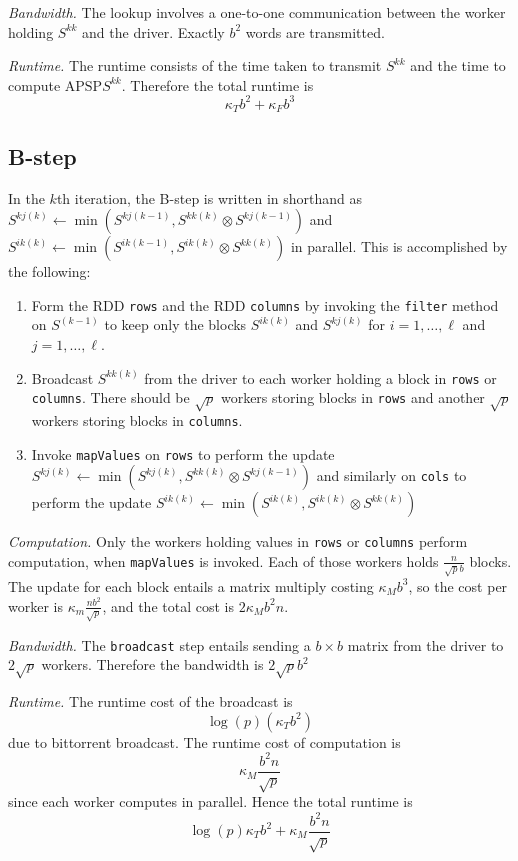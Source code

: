 \documentclass{article} %
\begin{document}
\emph{Bandwidth.}
The lookup involves a one-to-one communication between the worker holding $S^{kk}$ and the driver.
Exactly $b^2$ words are transmitted.

\emph{Runtime.}
The runtime consists of the time taken to transmit $S^{kk}$ and the time to compute $\text{APSP}S^{kk}$.
Therefore the total runtime is
\[
\kappa_T b^2 + \kappa_F b^3
\]

\subsection{B-step}
In the $k$th iteration, the B-step is written in shorthand as
 $S^{kj(k)} \leftarrow \min(S^{kj(k-1)}, S^{kk(k)} \otimes S^{kj(k-1)})$ 
and 
$S^{ik(k)} \leftarrow \min(S^{ik(k-1)}, S^{ik(k)} \otimes S^{kk(k)})$
 in parallel.
This is accomplished by the following:
\begin{enumerate}
\item Form the RDD {\tt rows} and the RDD {\tt columns} by invoking
  the {\tt filter} method on $S^{(k-1)}$ to keep only the blocks
  $S^{ik(k)}$ and $S^{kj(k)}$ for $i = 1,\hdots, \ell$ and $j =
  1,\hdots, \ell$.
\item Broadcast $S^{kk(k)}$ from the driver to each worker holding a
  block in {\tt rows} or {\tt columns}.  There should be $\sqrt{p}$
  workers storing blocks in {\tt rows} and another $\sqrt{p}$ workers
  storing blocks in {\tt columns}.
\item Invoke {\tt mapValues} on {\tt rows} to perform the update
  $S^{kj(k)} \leftarrow \min(S^{kj(k)}, S^{kk(k)} \otimes S^{kj(k-1)})$ and similarly
  on {\tt cols} to perform the update $S^{ik(k)} \leftarrow \min(S^{ik(k)}, S^{ik(k)}
  \otimes S^{kk(k)})$
\end{enumerate}

\emph{Computation.}  Only the workers holding values in {\tt rows} or
     {\tt columns} perform computation, when {\tt mapValues} is
     invoked.  Each of those workers holds $\frac{n}{\sqrt{p}b}$
     blocks.  The update for each block entails a matrix multiply
     costing $\kappa_M b^3$, so the cost per worker is $\kappa_m
     \frac{nb^2}{\sqrt{p}}$, and the total cost is $2\kappa_M b^2 n$.

\emph{Bandwidth.} The {\tt broadcast} step entails sending a $b \times
b$ matrix from the driver to $2\sqrt{p}$ workers.  Therefore the
bandwidth is $2\sqrt{p}b^2$

\emph{Runtime.} The runtime cost of the broadcast is
\[
\log(p)(\kappa_T b^2)
\]
due to bittorrent broadcast.
The runtime cost of computation is
\[
\kappa_M \frac{b^2 n}{\sqrt{p}}
\]
since each worker computes in parallel.
Hence the total runtime is
\[
\log(p)\kappa_T b^2 + \kappa_M \frac{b^2 n}{\sqrt{p}}
\]
\end{document}
